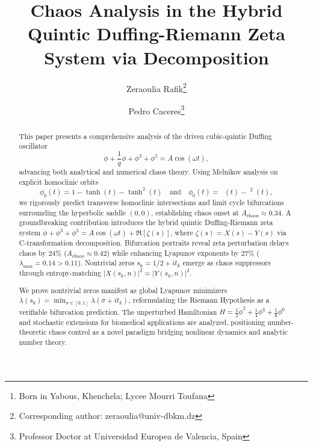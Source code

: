 \documentclass{ws-ijbc}
\DeclareMathOperator{\RZsech}{sech_{RZ}}
\begin{document}

\title{ Chaos Analysis in the Hybrid Quintic Duffing-Riemann Zeta System via Decomposition\\
}

\author{Zeraoulia Rafik\footnote{Corresponding author: zeraoulia@univ-dbkm.dz}}
\address{Khemis Miliana University, Algeria\\
Department of Mathematics\\
Laboratory of Pure and Applied Mathematics (LMPA)\\
Email: zeraoulia@univ-dbkm.dz\footnote{Born in Yabous, Khenchela; Lycee Mourri Toufana}}

\author{Pedro Caceres\footnote{Professor Doctor at Universidad Europea de Valencia, Spain}}
\address{United States of America\\
Universidad Europea de Valencia (Spain)\\
Email: Pedrojesus.caceres@universidadeuropea.es}


\maketitle

\begin{abstract}
This paper presents a comprehensive analysis of the driven cubic-quintic Duffing oscillator
\[
\ddot{\phi}+\frac{1}{q}\dot{\phi}+\phi^3+\phi^5=A\cos(\omega t),
\]
advancing both analytical and numerical chaos theory. Using Melnikov analysis on explicit homoclinic orbits
\[
\phi_0(t)=1-\tanh(t)-\tanh^2(t) \quad \text{and} \quad 
\phi_0(t)=\RZsech(t)-\RZsech^2(t),
\]
we rigorously predict transverse homoclinic intersections and limit cycle bifurcations surrounding the hyperbolic saddle $(0,0)$, establishing chaos onset at $A_\mathrm{chaos}\approx0.34$.
A groundbreaking contribution introduces the hybrid quintic Duffing-Riemann zeta system $\ddot{\phi}+\phi^3+\phi^5=A\cos(\omega t)+\Re[\zeta(s)]$, where $\zeta(s)=X(s)-Y(s)$ via C-transformation decomposition. Bifurcation portraits reveal zeta perturbation delays chaos by $24\%$ ($A_\text{chaos}\approx0.42$) while enhancing Lyapunov exponents by $27\%$ ($\lambda_\text{max}=0.14>0.11$). Nontrivial zeros $s_k=1/2+it_k$ emerge as chaos suppressors through entropy-matching $|X(s_k,n)|^2=|Y(s_k,n)|^2$.

We prove nontrivial zeros manifest as global Lyapunov minimizers $\lambda(s_k)=\min_{\sigma\in[0,1]}\lambda(\sigma+it_k)$, reformulating the Riemann Hypothesis as a verifiable bifurcation prediction. The unperturbed Hamiltonian $H=\frac{1}{2}\dot{\phi}^2+\frac{1}{4}\phi^4+\frac{1}{6}\phi^6$ and stochastic extensions for biomedical applications are analyzed, positioning number-theoretic chaos control as a novel paradigm bridging nonlinear dynamics and analytic number theory.

\end{abstract}
\end{document}
